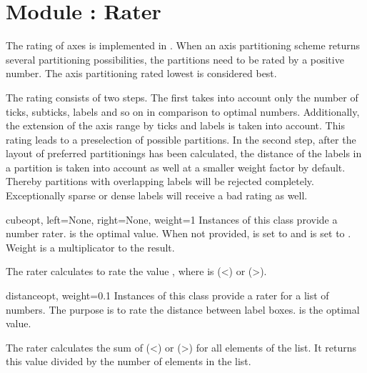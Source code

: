 \section{Module : Rater} %


The rating of axes is implemented in . When
an axis partitioning scheme returns several partitioning
possibilities, the partitions need to be rated by a positive number.
The axis partitioning rated lowest is considered best.

The rating consists of two steps. The first takes into account only
the number of ticks, subticks, labels and so on in comparison to
optimal numbers. Additionally, the extension of the axis range by
ticks and labels is taken into account. This rating leads to a
preselection of possible partitions. In the second step, after the
layout of preferred partitionings has been calculated, the distance of 
the labels in a partition is taken into account as well at a smaller
weight factor by default. Thereby partitions with overlapping labels
will be rejected completely. Exceptionally sparse or dense labels will
receive a bad rating as well.

\begin{classdesc}{cube}{opt, left=None, right=None, weight=1}
  Instances of this class provide a number rater.  is the
  optimal value. When not provided,  is set to  and
   is set to . Weight is a multiplicator
  to the result.

  The rater calculates
   to rate the
  value , where  is 
  (\textless{}) or 
  (\textgreater{}).
\end{classdesc}

\begin{classdesc}{distance}{opt, weight=0.1}
  Instances of this class provide a rater for a list of numbers.
  The purpose is to rate the distance between label boxes. 
  is the optimal value.

  The rater calculates the sum of 
  (\textless{}) or 
  (\textgreater{}) for all elements  of the
  list. It returns this value divided by the number of elements in the
  list.
\end{classdesc}

